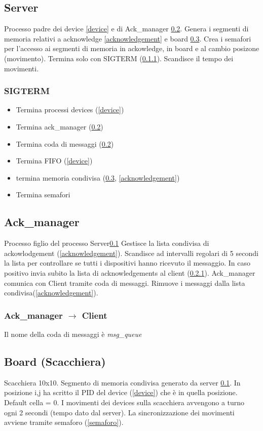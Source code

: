 \documentclass[10pt,a4paper]{article}
\begin{document}
{\subsection{Server} \label{server}
Processo padre dei device \ref{device} e di Ack\_manager \ref{AckManager}.
Genera i segmenti di memoria relativi a acknowledge \ref{acknowledgement} e board \ref{board}.
Crea i semafori per l'accesso ai segmenti di memoria in ackowledge, in board e al cambio posizone (movimento).  
Termina solo con SIGTERM (\ref{sigterm}). 
Scandisce il tempo dei movimenti.
\subsubsection{SIGTERM} \label{sigterm}
\begin{itemize}
\item Termina processi devices (\ref{device})
\item Termina ack\_manager (\ref{AckManager})
\item Termina coda di messaggi (\ref{AckManager})
\item Termina FIFO (\ref{device})
\item termina memoria condivisa (\ref{board}, \ref{acknowledgement})
\item Termina semafori
\end{itemize}

\subsection{Ack\_manager} \label{AckManager}
Processo figlio del processo Server\ref{server} Gestisce la lista condivisa di ackowlodgement (\ref{acknowledgement}). 
Scandisce ad intervalli regolari di 5 secondi la lista per controllare se tutti i dispositivi hanno ricevuto il messaggio.
In caso positivo invia subito la lista di acknowledgements al client (\ref{AckManagerClient}).
Ack\_manager comunica con Client tramite coda di messaggi.
Rimuove i messaggi dalla lista condivisa(\ref{acknowledgement}).
\subsubsection{Ack\_manager $\rightarrow$ Client} \label{AckManagerClient}
Il nome della coda di messaggi è \emph{msg\_queue}

\subsection{Board (Scacchiera)} \label{board}
Scacchiera 10x10. Segmento di memoria condivisa generato da server \ref{server}. In posizione i,j ha scritto il PID del device (\ref{device}) che è in quella posizione. Default cella = 0. I movimenti dei devices sulla scacchiera avvengono a turno ogni 2 secondi (tempo dato dal server). La sincronizzazione dei movimenti avviene tramite semaforo (\ref{semaforo}).
}
\end{document}
